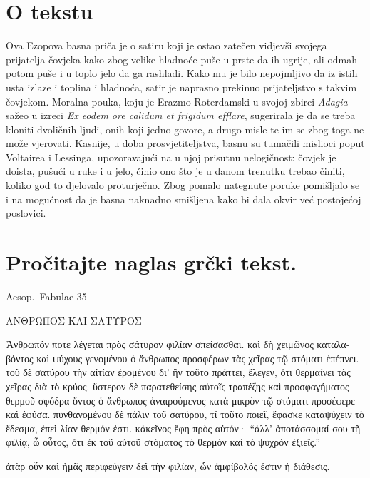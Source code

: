 


\section*{O tekstu}

Ova Ezopova basna priča je o satiru koji je ostao zatečen vidjevši svojega prijatelja čovjeka kako zbog velike hladnoće puše u prste da ih ugrije, ali odmah potom puše i u toplo jelo da ga rashladi. Kako mu je bilo nepojmljivo da iz istih usta izlaze i toplina i hladnoća, satir je naprasno prekinuo prijateljstvo s takvim čovjekom. Moralna pouka, koju je Erazmo Roterdamski u svojoj zbirci \textit{Adagia} sažeo u izreci \textit{Ex eodem ore calidum et frigidum efflare}, sugerirala je da se treba kloniti dvoličnih ljudi, onih koji jedno govore, a drugo misle te im se zbog toga ne može vjerovati. Kasnije, u doba prosvjetiteljstva, basnu su tumačili mislioci poput Voltairea i Lessinga, upozoravajući na u njoj prisutnu nelogičnost: čovjek je doista, pušući u ruke i u jelo, činio ono što je u danom trenutku trebao činiti, koliko god to djelovalo proturječno. Zbog pomalo nategnute poruke pomišljalo se i na mogućnost da je basna naknadno smišljena kako bi dala okvir već postojećoj poslovici.


\section*{Pročitajte naglas grčki tekst.}
Aesop.\ Fabulae 35

\medskip

{\large
\begin{greek}
\noindent ΑΝΘΡΩΠΟΣ ΚΑΙ ΣΑΤΥΡΟΣ 

\noindent Ἄνθρωπόν ποτε λέγεται πρὸς σάτυρον φιλίαν σπείσασθαι. καὶ δὴ χειμῶνος καταλαβόντος καὶ ψύχους γενομένου ὁ ἄνθρωπος προσφέρων τὰς χεῖρας τῷ στόματι ἐπέπνει. τοῦ δὲ σατύρου τὴν αἰτίαν ἐρομένου δι' ἣν τοῦτο πράττει, ἔλεγεν, ὅτι θερμαίνει τὰς χεῖρας διὰ τὸ κρύος. ὕστερον δὲ παρατεθείσης αὐτοῖς τραπέζης καὶ προσφαγήματος θερμοῦ σφόδρα ὄντος ὁ ἄνθρωπος ἀναιρούμενος κατὰ μικρὸν τῷ στόματι προσέφερε καὶ ἐφύσα. πυνθανομένου δὲ πάλιν τοῦ σατύρου, τί τοῦτο ποιεῖ, ἔφασκε καταψύχειν τὸ ἔδεσμα, ἐπεὶ λίαν θερμόν ἐστι. κἀκεῖνος ἔφη πρὸς αὐτόν· ``ἀλλ' ἀποτάσσομαί σου τῇ φιλίᾳ, ὦ οὗτος, ὅτι ἐκ τοῦ αὐτοῦ στόματος τὸ θερμὸν καὶ τὸ ψυχρὸν ἐξιεῖς.''

ἀτὰρ οὖν καὶ ἡμᾶς περιφεύγειν δεῖ τὴν φιλίαν, ὧν ἀμφίβολός ἐστιν ἡ διάθεσις.

\end{greek}

}

